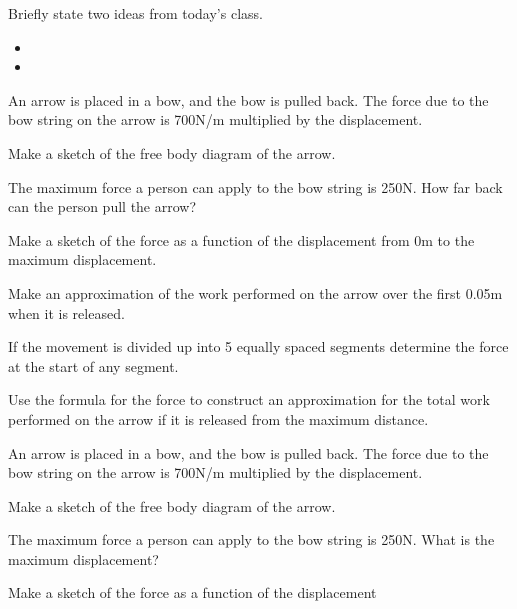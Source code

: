 \begin{problem}
\item Briefly state two ideas from today's class.
  \begin{itemize}
  \item
  \item
  \end{itemize}
\item An arrow is placed in a bow, and the bow is pulled back. The
  force due to the bow string on the arrow is 700N/m multiplied by the
  displacement.
  \begin{subproblem}
  \item Make a sketch of the free body diagram of the arrow.
    \vfill
  \item The maximum force a person can apply to the bow string is
    250N. How far back can the person pull the arrow?
    \vfill
  \item Make a sketch of the force as a function of the displacement
    from 0m to the maximum displacement.
    \vfill
    \clearpage
  \item Make an approximation of the work performed on the arrow over
    the first 0.05m when it is released.
    \vfill
  \item If the movement is divided up into 5 equally spaced segments
    determine the force at the start of any segment.
    \vfill
  \item Use the formula for the force to construct an approximation
    for the total work performed on the arrow if it is released from
    the maximum distance.
    \vfill
  \end{subproblem}
  \clearpage
\item An arrow is placed in a bow, and the bow is pulled back. The
    force due to the bow string on the arrow is 700N/m multiplied by the
    displacement.
    \begin{subproblem}
    \item Make a sketch of the free body diagram of the arrow.
      \vfill
    \item The maximum force a person can apply to the bow string is
      250N. What is the maximum displacement?
      \vfill
    \item Make a sketch of the force as a function of the displacement

\end{subproblem}
\end{problem}
